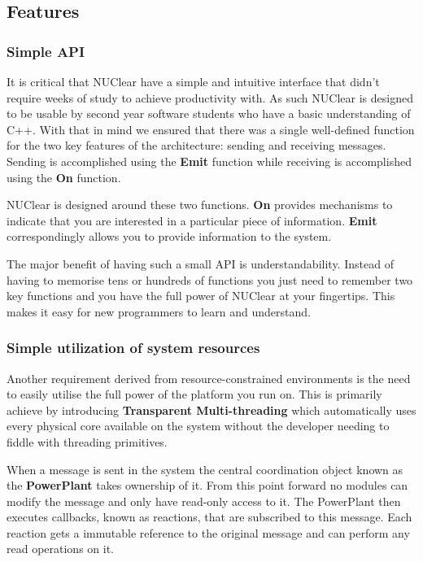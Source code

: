 \documentclass[english,12pt]{scrartcl}
\begin{document}
		\subsection{Features}
			\subsubsection{Simple API}
				It is critical that NUClear have a simple and intuitive interface that didn't require weeks of study to achieve productivity with.
				As such NUClear is designed to be usable by second year software students who have a basic understanding of C++. 
				With that in mind we ensured that there was a single well-defined function for the two key features of the architecture: sending and receiving messages. Sending is accomplished using the \textbf{Emit} function while receiving is accomplished using the \textbf{On} function.
				
				NUClear is designed around these two functions. \textbf{On} provides mechanisms to indicate that you are interested in a particular piece of information.
				\textbf{Emit} correspondingly allows you to provide information to the system.
				
				The major benefit of having such a small API is understandability. 
				Instead of having to memorise tens or hundreds of functions you just need to remember two key functions and you have the full power of NUClear at your fingertips.
				This makes it easy for new programmers to learn and understand.
			
			\subsubsection{Simple utilization of system resources}
				Another requirement derived from resource-constrained environments is the need to easily utilise the full power of the platform you run on.
				This is primarily achieve by introducing \textbf{Transparent Multi-threading} which automatically uses every physical core available on the system without the developer needing to fiddle with threading primitives.
				
				When a message is sent in the system the central coordination object known as the \textbf{PowerPlant} takes ownership of it. 
				From this point forward no modules can modify the message and only have read-only access to it.
				The PowerPlant then executes callbacks, known as reactions, that are subscribed to this message.
				Each reaction gets a immutable reference to the original message and can perform any read operations on it.
				
\end{document}
